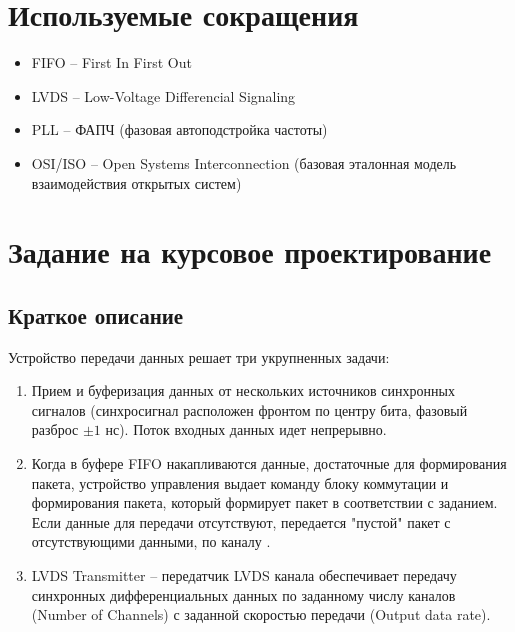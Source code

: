 





\section*{Используемые сокращения}

\begin{itemize}
	\setlength{\itemsep}{0pt}
	\item FIFO -- First In First Out
	\item LVDS -- Low-Voltage Differencial Signaling
	\item PLL -- ФАПЧ (фазовая автоподстройка частоты)
	\item OSI/ISO -- Open Systems Interconnection (базовая эталонная модель взаимодействия открытых систем)
\end{itemize}

\newpage

\section*{Задание на курсовое проектирование}

\subsection*{Краткое описание}

Устройство передачи данных решает три укрупненных задачи:
\begin{enumerate}
	\item Прием и буферизация данных от нескольких источников синхронных сигналов (синхросигнал расположен фронтом по центру бита, фазовый разброс $\pm1$ нс). Поток входных данных идет непрерывно.
	\item Когда в буфере FIFO накапливаются данные, достаточные для формирования пакета, устройство управления выдает команду блоку коммутации и формирования пакета, который формирует пакет в соответствии с заданием. Если данные для передачи отсутствуют, передается "пустой" пакет с отсутствующими данными,  по каналу .
	\item LVDS Transmitter -- передатчик LVDS канала обеспечивает передачу синхронных дифференциальных данных по заданному числу каналов (Number of Channels) с заданной скоростью передачи (Output data rate).
\end{enumerate}

